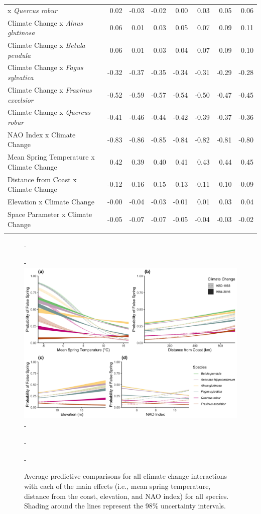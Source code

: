 \documentclass{article}\usepackage[]{graphicx}\usepackage[]{color}
\begin{document}
\begin{longtable}{lrrrrrrr}
x\textit{ Quercus robur} & 0.02 & -0.03 & -0.02 & 0.00 & 0.03 & 0.05 & 0.06 \\ 
  Climate Change
x\textit{ Alnus glutinosa} & 0.06 & 0.01 & 0.03 & 0.05 & 0.07 & 0.09 & 0.11 \\ 
  Climate Change
x\textit{ Betula pendula} & 0.06 & 0.01 & 0.03 & 0.04 & 0.07 & 0.09 & 0.10 \\ 
  Climate Change
x\textit{ Fagus sylvatica} & -0.32 & -0.37 & -0.35 & -0.34 & -0.31 & -0.29 & -0.28 \\ 
  Climate Change
x\textit{ Fraxinus excelsior} & -0.52 & -0.59 & -0.57 & -0.54 & -0.50 & -0.47 & -0.45 \\ 
  Climate Change
x\textit{ Quercus robur} & -0.41 & -0.46 & -0.44 & -0.42 & -0.39 & -0.37 & -0.36 \\ 
  NAO Index x Climate Change & -0.83 & -0.86 & -0.85 & -0.84 & -0.82 & -0.81 & -0.80 \\ 
  Mean Spring 
Temperature x Climate Change & 0.42 & 0.39 & 0.40 & 0.41 & 0.43 & 0.44 & 0.45 \\ 
  Distance from 
Coast x Climate Change & -0.12 & -0.16 & -0.15 & -0.13 & -0.11 & -0.10 & -0.09 \\ 
  Elevation x Climate Change & -0.00 & -0.04 & -0.03 & -0.01 & 0.01 & 0.03 & 0.04 \\ 
  Space Parameter x Climate Change & -0.05 & -0.07 & -0.07 & -0.05 & -0.04 & -0.03 & -0.02 \\ 
   \hline
\hline
\label{tab:suppmodorig}
\end{longtable}



{\begin{figure} [H]
  -\begin{center}
  -\includegraphics[width=16cm]{..//analyses/figures/APC_allpred_allspp_baseR_98.png}
  -\caption{Average predictive comparisons for all climate change interactions with each of the main effects (i.e., mean spring temperature, distance from the coast, elevation, and NAO index) for all species. Shading around the lines represent the 98\% uncertainty intervals. }\label{fig:suppapc}
  -\end{center}
  -\end{figure}}
  
\end{document}

